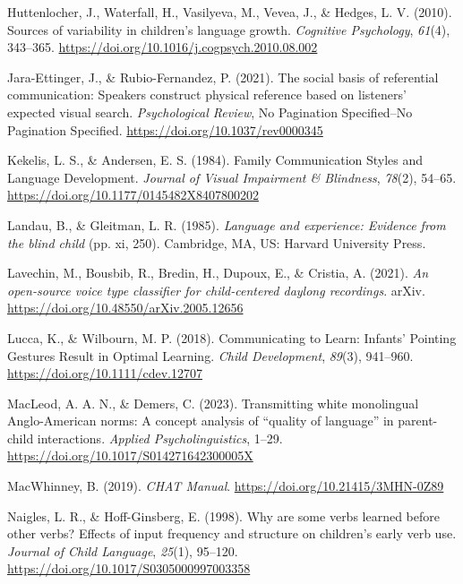 \documentclass[
  man,floatsintext]{apa6}
\newlength{\cslhangindent}
\newlength{\cslentryspacingunit} %
\newenvironment{CSLReferences}[2] %
 {%
  \setlength{\parindent}{0pt}
  \ifodd #1
  \let\oldpar\par
  \def\par{\hangindent=\cslhangindent\oldpar}
  \fi
  \setlength{\parskip}{#2\cslentryspacingunit}
 }%
 {}
\begin{document}
\begin{CSLReferences}{1}{0}
\leavevmode{}%
Huttenlocher, J., Waterfall, H., Vasilyeva, M., Vevea, J., \& Hedges, L. V. (2010). Sources of variability in children's language growth. \emph{Cognitive Psychology}, \emph{61}(4), 343--365. \url{https://doi.org/10.1016/j.cogpsych.2010.08.002}

\leavevmode{}%
Jara-Ettinger, J., \& Rubio-Fernandez, P. (2021). The social basis of referential communication: {Speakers} construct physical reference based on listeners' expected visual search. \emph{Psychological Review}, No Pagination Specified--No Pagination Specified. \url{https://doi.org/10.1037/rev0000345}

\leavevmode{}%
Kekelis, L. S., \& Andersen, E. S. (1984). Family {Communication Styles} and {Language Development}. \emph{Journal of Visual Impairment \& Blindness}, \emph{78}(2), 54--65. \url{https://doi.org/10.1177/0145482X8407800202}

\leavevmode{}%
Landau, B., \& Gleitman, L. R. (1985). \emph{Language and experience: {Evidence} from the blind child} (pp. xi, 250). {Cambridge, MA, US}: {Harvard University Press}.

\leavevmode{}%
Lavechin, M., Bousbib, R., Bredin, H., Dupoux, E., \& Cristia, A. (2021). \emph{An open-source voice type classifier for child-centered daylong recordings}. {arXiv}. \url{https://doi.org/10.48550/arXiv.2005.12656}

\leavevmode{}%
Lucca, K., \& Wilbourn, M. P. (2018). Communicating to {Learn}: {Infants}' {Pointing Gestures Result} in {Optimal Learning}. \emph{Child Development}, \emph{89}(3), 941--960. \url{https://doi.org/10.1111/cdev.12707}

\leavevmode{}%
MacLeod, A. A. N., \& Demers, C. (2023). Transmitting white monolingual {Anglo-American} norms: {A} concept analysis of {``quality of language''} in parent-child interactions. \emph{Applied Psycholinguistics}, 1--29. \url{https://doi.org/10.1017/S014271642300005X}

\leavevmode{}%
MacWhinney, B. (2019). \emph{{CHAT Manual}}. \url{https://doi.org/10.21415/3MHN-0Z89}

\leavevmode{}%
Naigles, L. R., \& Hoff-Ginsberg, E. (1998). Why are some verbs learned before other verbs? {Effects} of input frequency and structure on children's early verb use. \emph{Journal of Child Language}, \emph{25}(1), 95--120. \url{https://doi.org/10.1017/S0305000997003358}


\end{CSLReferences}
\end{document}
